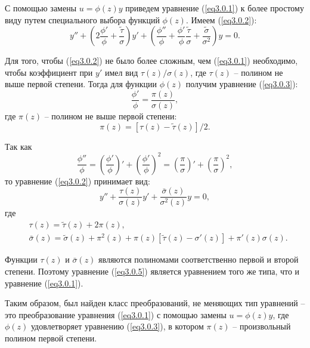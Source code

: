 С помощью замены \( u = \phi(z)y \) приведем уравнение (\ref{eq3.0.1}) к более
простому виду путем специального выбора функций \( \phi(z) \). Имеем
(\ref{eq3.0.2}):
\begin{equation}
    y'' + \left(2\frac{\phi'}{\phi} + \frac{\tilde{\tau}}{\sigma}\right)y' +
    \left(\frac{\phi''}{\phi} + \frac{\phi'}{\phi}\frac{\tilde{\tau}}{\sigma} +
    \frac{\tilde{\sigma}}{\sigma^2}\right)y = 0.
    \label{eq3.0.2}
\end{equation}

Для того, чтобы (\ref{eq3.0.2}) не было более сложным, чем (\ref{eq3.0.1})
необходимо, чтобы коэффициент при \( y' \) имел вид \( \tau(z)/\sigma(z) \),
где \( \tau(z) \) -- полином не выше первой степени. Тогда для функции
\( \phi(z) \) получим уравнение (\ref{eq3.0.3}):
\begin{equation}
    \frac{\phi'}{\phi} = \frac{\pi(z)}{\sigma(z)},
    \label{eq3.0.3}
\end{equation}
где \( \pi(z) \) -- полином не выше первой степени:
\begin{equation}
    \pi(z) = [\tau(z) - \tilde{\tau}(z)]/2.
    \label{eq3.0.4}
\end{equation}

Так как
\[
    \frac{\phi''}{\phi} = \left(\frac{\phi'}{\phi}\right)' +
    \left(\frac{\phi'}{\phi}\right)^2 = \left(\frac{\pi}{\sigma}\right)' +
    \left(\frac{\pi}{\sigma}\right)^2,
\]
то уравнение (\ref{eq3.0.2}) принимает вид:
\begin{equation}
    y'' + \frac{\tau(z)}{\sigma(z)}y' +
    \frac{\bar{\sigma}(z)}{\sigma^2(z)}y = 0,
    \label{eq3.0.5}
\end{equation}
где
\begin{align}
    & \tau(z) = \tilde{\tau}(z) + 2\pi(z), \label{eq3.0.6} \\
    & \bar{\sigma}(z) = \tilde{\sigma}(z) + \pi^2(z) +
    \pi(z)\left[\tilde{\tau}(z) - \sigma'(z)\right] + \pi'(z)\sigma(z).
    \label{eq3.0.7}
\end{align}

Функции \( \tau(z) \) и \( \bar{\sigma}(z) \) являются полиномами соответственно
первой и второй степени. Поэтому уравнение (\ref{eq3.0.5}) является уравнением
того же типа, что и уравнение (\ref{eq3.0.1}).

Таким образом, был найден класс преобразований, не меняющих тип уравнений -- это
 преобразование уравнения (\ref{eq3.0.1}) с помощью замены \( u = \phi(z)y \),
 где \( \phi(z) \) удовлетворяет уравнению (\ref{eq3.0.3}), в котором
 \( \pi(z) \) -- произвольный полином первой степени.

